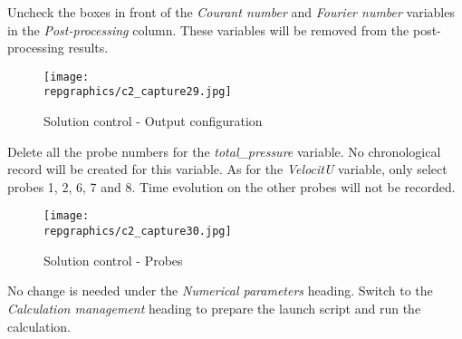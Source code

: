 Uncheck the boxes in front of the {\itshape Courant number} and {\itshape
Fourier number} variables in the {\itshape Post-processing} column. These
variables will be removed from the post-processing results.

\begin{figure}[h!]
\begin{center}
\texttt{[image: \\repgraphics/c2\_capture29.jpg]} 
\caption{Solution control - Output configuration}
\label{fig29_e2}
\end{center}
\end{figure}


\newpage
Delete all the probe numbers for the {\itshape total\_pressure} variable. No
chronological record will be created for this variable. As for the 
{\itshape VelocitU} variable, only select probes  1, 2, 6, 7 and 8. Time
evolution on the other probes will not be recorded.

\begin{figure}[h!]
\begin{center}
\texttt{[image: \\repgraphics/c2\_capture30.jpg]} 
\caption{Solution control - Probes}
\label{fig30_e2}
\end{center}
\end{figure}


No change is needed under the {\itshape Numerical parameters} heading.
Switch to the {\itshape Calculation management} heading to prepare the launch
script and run the calculation.

